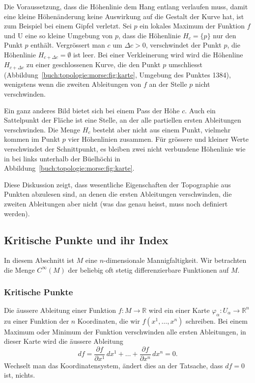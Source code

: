 Die Voraussetzung, dass die Höhenlinie dem Hang entlang verlaufen
muss, damit eine kleine Höhenänderung keine Auswirkung auf die
Gestalt der Kurve hat, ist zum Beispiel bei einem Gipfel verletzt.
Sei $p$ ein lokales Maximum der Funktion $f$ und U eine so kleine
Umgebung von $p$, dass die Höhenlinie $H_c = \{p\}$ nur den Punkt $p$
enthält.
Vergrössert man $c$ um $\Delta c>0$, verschwindet der Punkt $p$,
die Höhenlinie $H_{c+\Delta c}=\emptyset$ ist leer.
Bei einer Verkleinerung wird wird die Höhenline $H_{c+\Delta c}$ zu
einer geschlossenen Kurve, die den Punkt $p$ umschliesst
(Abbildung~\ref{buch:topologie:morse:fig:karte}, Umgebung des Punktes 1384),
wenigstens wenn die zweiten Ableitungen von $f$ an der Stelle $p$
nicht verschwinden.

Ein ganz anderes Bild bietet sich bei einem Pass der Höhe $c$.
Auch ein Sattelpunkt der Fläche ist eine Stelle, an der
alle partiellen ersten Ableitungen verschwinden.
Die Menge $H_c$ besteht aber nicht aus einem Punkt, vielmehr
kommen im Punkt $p$ vier Höhenlinien zusammen.
Für grössere und kleiner Werte verschwindet der Schnittpunkt,
es bleiben zwei nicht verbundene Höhenlinie wie in
bei links unterhalb der Büelhöchi in
Abbildung~\ref{buch:topologie:morse:fig:karte}.

Diese Diskussion zeigt, dass wesentliche Eigenschaften der Topographie
aus Punkten abzulesen sind, an denen die ersten Ableitungen verschwinden,
die zweiten Ableitungen aber nicht (was das genau heisst, muss noch
definiert werden).

%
%
\subsection{Kritische Punkte und ihr Index}
In diesem Abschnitt ist $M$ eine $n$-dimensionale Mannigfaltigkeit.
Wir betrachten die Menge $C^\infty(M)$ der beliebig oft stetig
differenzierbare Funktionen auf $M$.

%
%
\subsubsection{Kritische Punkte}
%
Die äussere Ableitung einer Funktion $f\colon M\to\mathbb{R}$ 
wird ein einer Karte $\varphi_\alpha\colon U_\alpha\to\mathbb{R}^n$
zu einer Funktion der $n$ Koordinaten, die wir $f(x^1,\dots,x^n)$
schreiben.
Bei einem Maximum oder Minimum der Funktion verschwinden alle ersten
Ableitungen, in dieser Karte wird die äussere Ableitung
\[
df
=
\frac{\partial f}{\partial x^1}\,dx^1
+
\dots
+
\frac{\partial f}{\partial x^n}\,dx^n
=
0.
\]
Wechselt man das Koordinatensystem, ändert dies an der Tatsache, dass
$df=0$ ist, nichts.

